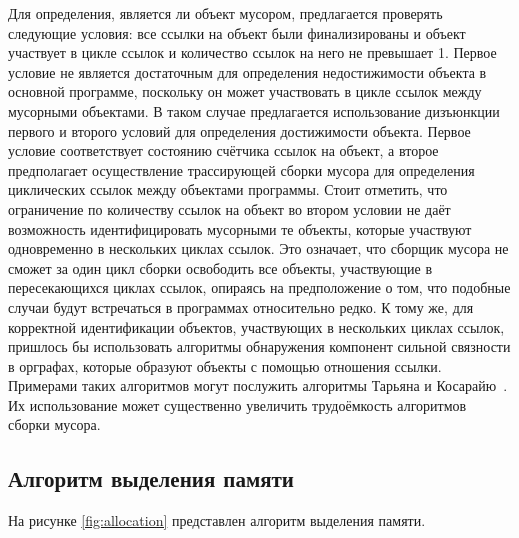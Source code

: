 Для определения, является ли объект мусором, предлагается проверять следующие условия: все ссылки на объект были финализированы и объект участвует в цикле ссылок и количество ссылок на него не превышает 1. Первое условие не является достаточным для определения недостижимости объекта в основной программе, поскольку он может участвовать в цикле ссылок между мусорными объектами. В таком случае предлагается использование дизъюнкции первого и второго условий для определения достижимости объекта. Первое условие соответствует состоянию счётчика ссылок на объект, а второе предполагает осуществление трассирующей сборки мусора для определения циклических ссылок между объектами программы. Стоит отметить, что ограничение по количеству ссылок на объект во втором условии не даёт возможность идентифицировать мусорными те объекты, которые участвуют одновременно в нескольких циклах ссылок. Это означает, что сборщик мусора не сможет за один цикл сборки освободить все объекты, участвующие в пересекающихся циклах ссылок, опираясь на предположение о том, что подобные случаи будут встречаться в программах относительно редко. К тому же, для корректной идентификации объектов, участвующих в нескольких циклах ссылок, пришлось бы использовать алгоритмы обнаружения компонент сильной связности в орграфах, которые образуют объекты с помощью отношения ссылки. Примерами таких алгоритмов могут послужить алгоритмы Тарьяна и Косарайю~\cite{graph_algorithms}. Их использование может существенно увеличить трудоёмкость алгоритмов сборки мусора.

\subsection{Алгоритм выделения памяти}

На рисунке \ref{fig:allocation} представлен алгоритм выделения памяти.

